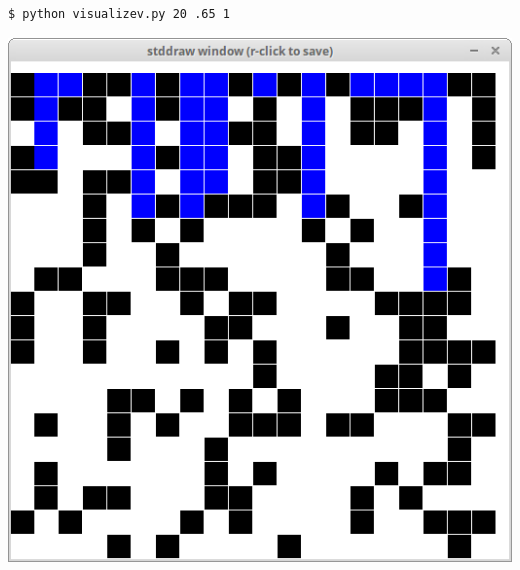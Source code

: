 \documentclass[8pt,a4paper,compress,handout]{beamer}
\begin{document}
\begin{frame}[fragile]
\begin{minipage}{160pt}
\begin{lstlisting}[language={}]
$ python visualizev.py 20 .65 1
\end{lstlisting}
\end{minipage}%
\begin{minipage}{140pt}
\hfill \includegraphics[scale=0.15]{figures/percolation4.png}
\end{minipage}

\smallskip


\end{frame}
\end{document}

